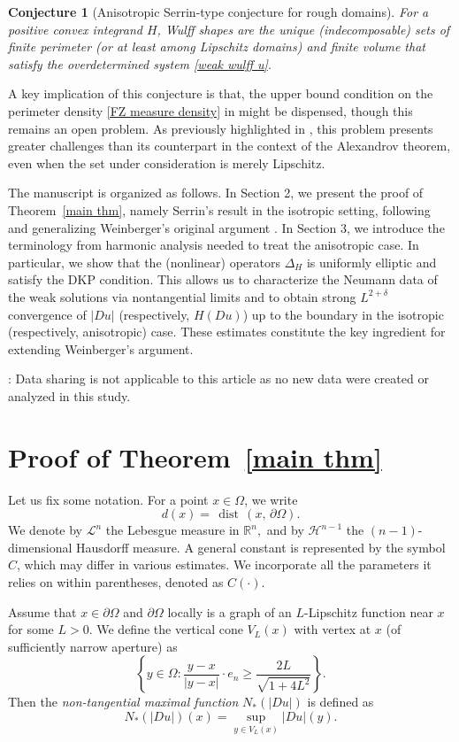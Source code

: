 \documentclass[reqno,11pt]{amsart}
\makeatletter
\def\dist{{\mathop\mathrm{\,dist\,}}}
\newtheorem{conj}[thm]{Conjecture}%
\numberwithin{equation}{section}
\theoremstyle{remark}
\makeatother
\begin{document}
\begin{conj}[Anisotropic Serrin-type conjecture for rough domains]
For a positive convex integrand $H$, Wulff shapes are the unique (indecomposable) sets of finite perimeter (or at least among Lipschitz domains) and finite volume that satisfy the overdetermined system \eqref{weak wulff u}.
\end{conj}  
A key implication of this conjecture is that, the upper bound condition on the perimeter density \eqref{FZ measure density} in \cite[Theorem 1.3]{FZ2025} might be dispensed, though this remains an open problem. As previously highlighted in \cite[Remark 1.5]{FZ2025}, this problem presents greater challenges than its counterpart in the context of the Alexandrov theorem, even when the set under consideration is merely Lipschitz.

The manuscript is organized as follows. In Section 2, we present the proof of Theorem~\ref{main thm}, namely Serrin's result in the isotropic setting, following and generalizing Weinberger's original argument \cite{W1971}. In Section 3, we introduce the terminology from harmonic analysis needed to treat the anisotropic case. In particular, we show that the (nonlinear) operators $\Delta_H$ is uniformly elliptic and satisfy the DKP condition. This allows us to characterize the Neumann data of the weak solutions via nontangential limits and to obtain strong $L^{2+\delta}$ convergence of $|Du|$ (respectively, $H(Du)$) up to the boundary in  the isotropic (respectively,  anisotropic) case. These estimates constitute the key ingredient for extending Weinberger's argument.

\medskip

: Data sharing is not applicable to this article as no new data were created or analyzed in this study.


\section{Proof of Theorem~\ref{main thm}}
Let us fix some notation. 
For a point $x\in \Omega$, we write
$$d(x)=\dist(x,\,\partial\Omega).$$
We denote by $\mathcal L^n$ the Lebesgue measure in $\mathbb R^n,$ and by $\mathscr H^{n-1}$ the $(n-1)$-dimensional Hausdorff measure. 
A general constant is represented by the symbol $C$, which may differ in various estimates. We incorporate all the parameters it relies on within parentheses, denoted as $C(\cdot)$.

Assume that $x\in \partial\Omega$ and $\partial\Omega$ locally is a graph of an $L$-Lipschitz function near $x$ for some $L>0$. We define the  vertical cone $V_L(x)$ with vertex at $x$ (of sufficiently narrow aperture) as
$$ \left\{y\in \Omega\colon \frac{y-x}{|y-x|}\cdot e_n \ge \frac{2L}{\sqrt{1+4L^2}}\right\}.  $$ 
Then the \emph{non-tangential maximal function} $N_* (|Du|)$ is defined as
$$N_*(|Du|)(x)=\sup_{y\in V_L(x)} |Du|(y).$$
\end{document}
